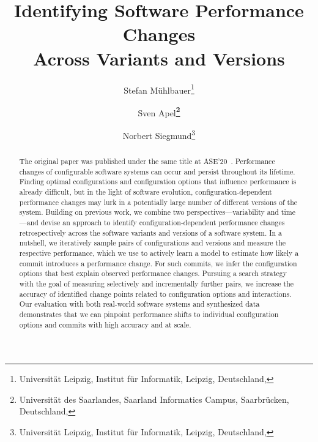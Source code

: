 \documentclass[utf8,biblatex]{lni}
\begin{document}
\title[Identifying Software Performance Changes Across Variants and Versions]{Identifying Software Performance Changes\\ Across Variants and Versions}
\author[Stefan Mühlbauer \and Sven Apel \and Norbert Siegmund]
{Stefan Mühlbauer\footnote{Universität Leipzig, Institut für Informatik, Leipzig, Deutschland, } \and
Sven Apel\textbf{\footnote{Universität des Saarlandes, Saarland Informatics Campus, Saarbrücken, Deutschland, }} \and
Norbert Siegmund\footnote{Universität Leipzig, Institut für Informatik, Leipzig, Deutschland, }
}
\maketitle

\begin{abstract}
{\color{blue!75!black}The original paper was published under the same title at ASE'20~\cite{muehlbauer_identifying_2020}.}
Performance changes of configurable software systems can occur and persist throughout its lifetime. Finding optimal configurations and configuration options that influence performance is already difficult, but in the light of software evolution, configuration-dependent performance changes may lurk in a potentially large number of different versions of the system. 
Building on previous work, we combine two perspectives---variability and time---and devise an approach to identify configuration-dependent performance changes retrospectively across the software variants and versions of a software system. In a nutshell, we iteratively sample pairs of configurations and versions and measure the respective performance, which we use to actively learn a model to estimate how likely a commit introduces a performance change. For such commits, we infer the configuration options that best explain observed performance changes. 
Pursuing a search strategy with the goal of measuring selectively and incrementally further pairs, we increase the accuracy of identified change points related to configuration options and interactions.
Our evaluation with both real-world software systems and synthesized data demonstrates that we can pinpoint performance shifts to individual configuration options and commits with high accuracy and at scale. 
\end{abstract}
\end{document}
